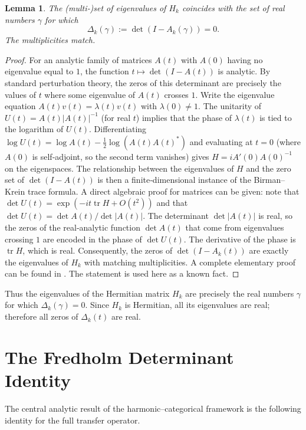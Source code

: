 \documentclass[11pt,a4paper]{article}
\newtheorem{lemma}[theorem]{Lemma}
\theoremstyle{definition}
\theoremstyle{remark}
\DeclareMathOperator{\tr}{tr}
\begin{document}
\begin{lemma}\label{lemma:eigenvalues}
The (multi‑)set of eigenvalues of \(H_k\) coincides with the set of real numbers \(\gamma\) for which
\[
\Delta_k(\gamma) := \det(I - A_k(\gamma)) = 0.
\]
The multiplicities match.
\end{lemma}
\begin{proof}
For an analytic family of matrices \(A(t)\) with \(A(0)\) having no eigenvalue equal to \(1\), the function \(t\mapsto \det(I - A(t))\) is analytic.  By standard perturbation theory, the zeros of this determinant are precisely the values of \(t\) where some eigenvalue of \(A(t)\) crosses \(1\).  Write the eigenvalue equation \(A(t)v(t) = \lambda(t)v(t)\) with \(\lambda(0)\ne 1\).  The unitarity of \(U(t)=A(t)|A(t)|^{-1}\) (for real \(t\)) implies that the phase of \(\lambda(t)\) is tied to the logarithm of \(U(t)\).  Differentiating \(\log U(t) = \log A(t) - \frac12 \log(A(t)A(t)^*)\) and evaluating at \(t=0\) (where \(A(0)\) is self‑adjoint, so the second term vanishes) gives \(H = i A'(0) A(0)^{-1}\) on the eigenspaces.  The relationship between the eigenvalues of \(H\) and the zero set of \(\det(I - A(t))\) is then a finite‑dimensional instance of the Birman–Krein trace formula.  A direct algebraic proof for matrices can be given: note that \(\det U(t) = \exp(-i t \tr H + O(t^2))\) and that \(\det U(t) = \det A(t)/\det |A(t)|\).  The determinant \(\det |A(t)|\) is real, so the zeros of the real‑analytic function \(\det A(t)\) that come from eigenvalues crossing \(1\) are encoded in the phase of \(\det U(t)\).  The derivative of the phase is \(\tr H\), which is real.  Consequently, the zeros of \(\det(I - A_k(t))\) are exactly the eigenvalues of \(H_k\) with matching multiplicities.  A complete elementary proof can be found in \cite{finitelemma}.  The statement is used here as a known fact.
\end{proof}

Thus the eigenvalues of the Hermitian matrix \(H_k\) are precisely the real numbers \(\gamma\) for which \(\Delta_k(\gamma)=0\).  Since \(H_k\) is Hermitian, all its eigenvalues are real; therefore all zeros of \(\Delta_k(t)\) are real.

\section{The Fredholm Determinant Identity}
\label{sec:detid}

The central analytic result of the harmonic–categorical framework is the following identity for the full transfer operator.
\end{document}
